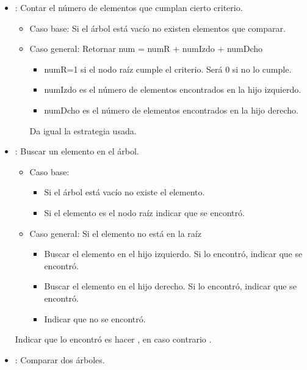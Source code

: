 \begin{itemize}
\item  {}: Contar el número de elementos que cumplan cierto criterio.

\begin{itemize}
\item Caso base: Si el árbol está vacío no existen elementos que comparar.
\item Caso general:  Retornar num = numR + numIzdo +  numDcho
	\begin{itemize}
	\item numR=1 si el nodo raíz cumple el criterio. Será 0 si no lo cumple.
	\item numIzdo es el número de elementos encontrados en la hijo izquierdo.
	\item numDcho es el número de elementos encontrados en la hijo derecho.
	\end{itemize}
	Da igual la estrategia usada.
\end{itemize}



\item {}:  Buscar un elemento en el árbol.

\begin{itemize}
\item Caso base: 
	\begin{itemize}
	\item Si el árbol está vacío no existe el elemento.
	\item Si el elemento es el nodo raíz indicar que se encontró.
	\end{itemize}
\item Caso general: Si el elemento no está en la raíz
	\begin{itemize}
	\item Buscar el elemento en el hijo izquierdo. Si lo encontró, indicar que se encontró.
	\item Buscar el elemento en el hijo derecho. Si lo encontró, indicar que se encontró.
	\item Indicar que no se encontró.
	\end{itemize}
\end{itemize}

Indicar que lo encontró es hacer , en caso contrario .


\item {}: Comparar dos árboles.


\end{itemize}
